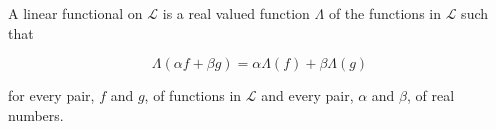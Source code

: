 A linear functional on $\mathcal{L}$ is a real valued function $\Lambda$ of the functions in $\mathcal{L}$ such that

$$\Lambda(\alpha f + \beta g) = \alpha \Lambda(f) + \beta \Lambda(g)$$

for every pair, $f$ and $g$, of functions in $\mathcal{L}$ and every pair, $\alpha$ and $\beta$, of real numbers.
